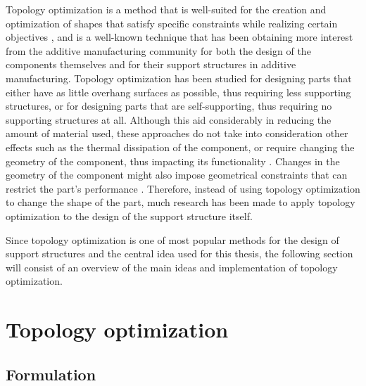 \documentclass[../main.tex]{subfiles}
\begin{document}
Topology optimization is a method that is well-suited for the creation and optimization of shapes that satisfy specific constraints while realizing certain objectives \cite{bendsoeTopologyOptimization2002}, and is a well-known technique that has been obtaining more interest from the additive manufacturing community for both the design of the components themselves and for their support structures in additive manufacturing. Topology optimization has been studied for designing parts that either have as little overhang surfaces as possible, thus requiring less supporting structures, or for designing parts that are self-supporting, thus requiring no supporting structures at all. Although this aid considerably in reducing the amount of material used, these approaches do not take into consideration other effects such as the thermal dissipation of the component, or require changing the geometry of the component, thus impacting its functionality \cite{yeTopologyOptimisationSelfsupporting2023}. Changes in the geometry of the component might also impose geometrical constraints that can restrict the part's performance \cite{langelaarTOPOLOGYOPTIMIZATIONADDITIVE2016}. Therefore, instead of using topology optimization to change the shape of the part, much research has been made to apply topology optimization to the design of the support structure itself.

Since topology optimization is one of most popular methods for the design of support structures and the central idea used for this thesis, the following section will consist of an overview of the main ideas and implementation of topology optimization.

\section{Topology optimization}

\subsection{Formulation}
\end{document}
